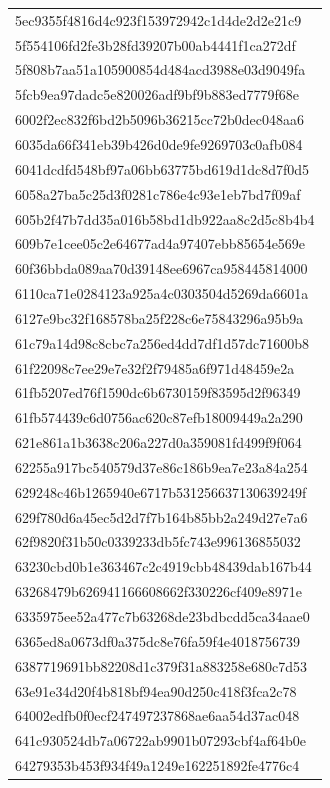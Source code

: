\begin{tabular}{l}
5ec9355f4816d4c923f153972942c1d4de2d2e21c9 \\
5f554106fd2fe3b28fd39207b00ab4441f1ca272df \\
5f808b7aa51a105900854d484acd3988e03d9049fa \\
5fcb9ea97dadc5e820026adf9bf9b883ed7779f68e \\
6002f2ec832f6bd2b5096b36215cc72b0dec048aa6 \\
6035da66f341eb39b426d0de9fe9269703c0afb084 \\
6041dcdfd548bf97a06bb63775bd619d1dc8d7f0d5 \\
6058a27ba5c25d3f0281c786e4c93e1eb7bd7f09af \\
605b2f47b7dd35a016b58bd1db922aa8c2d5c8b4b4 \\
609b7e1cee05c2e64677ad4a97407ebb85654e569e \\
60f36bbda089aa70d39148ee6967ca958445814000 \\
6110ca71e0284123a925a4c0303504d5269da6601a \\
6127e9bc32f168578ba25f228c6e75843296a95b9a \\
61c79a14d98c8cbc7a256ed4dd7df1d57dc71600b8 \\
61f22098c7ee29e7e32f2f79485a6f971d48459e2a \\
61fb5207ed76f1590dc6b6730159f83595d2f96349 \\
61fb574439c6d0756ac620c87efb18009449a2a290 \\
621e861a1b3638c206a227d0a359081fd499f9f064 \\
62255a917bc540579d37e86c186b9ea7e23a84a254 \\
629248c46b1265940e6717b531256637130639249f \\
629f780d6a45ec5d2d7f7b164b85bb2a249d27e7a6 \\
62f9820f31b50c0339233db5fc743e996136855032 \\
63230cbd0b1e363467c2c4919cbb48439dab167b44 \\
63268479b626941166608662f330226cf409e8971e \\
6335975ee52a477c7b63268de23bdbcdd5ca34aae0 \\
6365ed8a0673df0a375dc8e76fa59f4e4018756739 \\
6387719691bb82208d1c379f31a883258e680c7d53 \\
63e91e34d20f4b818bf94ea90d250c418f3fca2c78 \\
64002edfb0f0ecf247497237868ae6aa54d37ac048 \\
641c930524db7a06722ab9901b07293cbf4af64b0e \\
64279353b453f934f49a1249e162251892fe4776c4 \\

\end{tabular}
